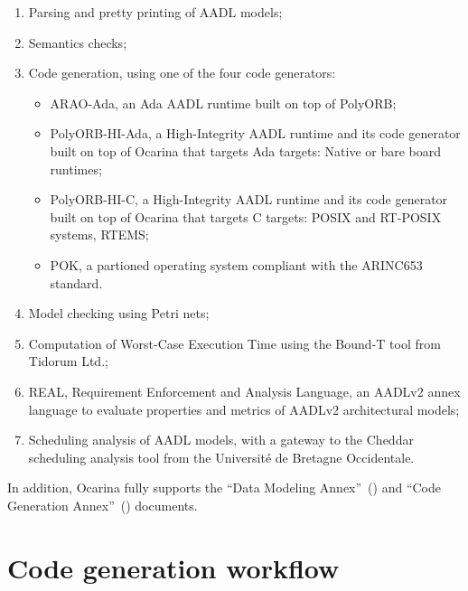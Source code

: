 \documentclass[11pt]{book}
\begin{document}
\begin{enumerate}
\item Parsing and pretty printing of AADL models;

\item Semantics checks;

\item Code generation, using one of the four code generators:

\begin{itemize}
\item ARAO-Ada, an Ada AADL runtime built on top of PolyORB;

\item PolyORB-HI-Ada, a High-Integrity AADL runtime and its code
generator built on top of Ocarina that targets Ada targets: Native or
bare board runtimes; 

\item PolyORB-HI-C, a High-Integrity AADL runtime and its code
generator built on top of Ocarina that targets C targets: POSIX and
RT-POSIX systems, RTEMS;

\item POK, a partioned operating system compliant with the ARINC653 standard.

\end{itemize}

\item Model checking using Petri nets;

\item Computation of Worst-Case Execution Time using the Bound-T
tool from Tidorum Ltd.;

\item REAL, Requirement Enforcement and Analysis Language, an AADLv2 annex
language to evaluate properties and metrics of AADLv2 architectural models;

\item Scheduling analysis of AADL models, with a gateway to the Cheddar 
scheduling analysis tool from the Université de Bretagne Occidentale.

\end{enumerate}

In addition, Ocarina fully supports the ``Data Modeling
 Annex''~(\cite{SAE2009data}) and ``Code Generation
 Annex''~(\cite{SAE2009prog}) documents.

\section{Code generation workflow}
\end{document}
